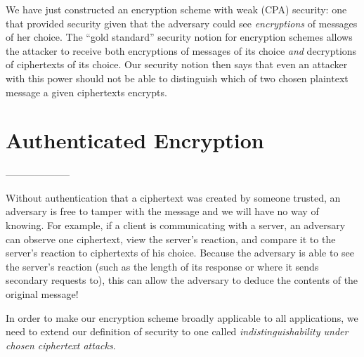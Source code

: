 We have just constructed an encryption scheme with
weak (CPA) security: one that provided security
given that the adversary could see
\emph{encryptions} of messages of her choice.
The ``gold standard'' security notion for encryption
schemes allows the attacker to receive both encryptions
of messages of its choice 
\emph{and} decryptions of ciphertexts of its choice.
Our security notion then says that 
even an attacker with this power should not be
able to distinguish which of two chosen plaintext
message a given ciphertexts encrypts.

\section{Authenticated Encryption}

--------------------

Without authentication that a ciphertext was created by someone trusted, an adversary is free to tamper with the message and we will have no way of knowing. For example, if a client is communicating with a server, an adversary can observe one ciphertext, view the server's reaction, and compare it to the server's reaction to ciphertexts of his choice. Because the adversary is able to see the server's reaction (such as the length of its response or where it sends secondary requests to), this can allow the adversary to deduce the contents of the original message! 

In order to make our encryption scheme broadly applicable to all applications, we need to extend our definition of security to one called \emph{indistinguishability under chosen ciphertext attacks}.

